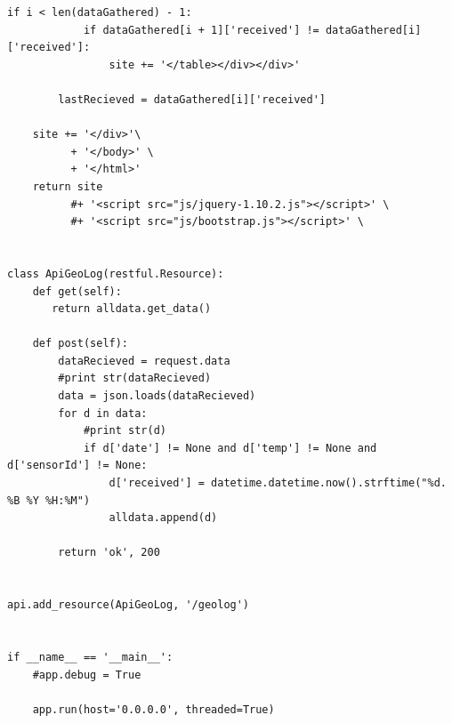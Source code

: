 \begin{lstlisting}[frame=single, label=httpCode, caption={Code for the HTTP server language=Python}]
        if i < len(dataGathered) - 1:
            if dataGathered[i + 1]['received'] != dataGathered[i]['received']:
                site += '</table></div></div>'

        lastRecieved = dataGathered[i]['received']
            
    site += '</div>'\
          + '</body>' \
          + '</html>' 
    return site
          #+ '<script src="js/jquery-1.10.2.js"></script>' \
          #+ '<script src="js/bootstrap.js"></script>' \


class ApiGeoLog(restful.Resource):
    def get(self):  
       return alldata.get_data()   

    def post(self):
        dataRecieved = request.data
        #print str(dataRecieved)
        data = json.loads(dataRecieved)
        for d in data:
            #print str(d)
            if d['date'] != None and d['temp'] != None and d['sensorId'] != None:
                d['received'] = datetime.datetime.now().strftime("%d. %B %Y %H:%M")
                alldata.append(d)
        
        return 'ok', 200


api.add_resource(ApiGeoLog, '/geolog')


if __name__ == '__main__':
    #app.debug = True    
    
    app.run(host='0.0.0.0', threaded=True)

\end{lstlisting}